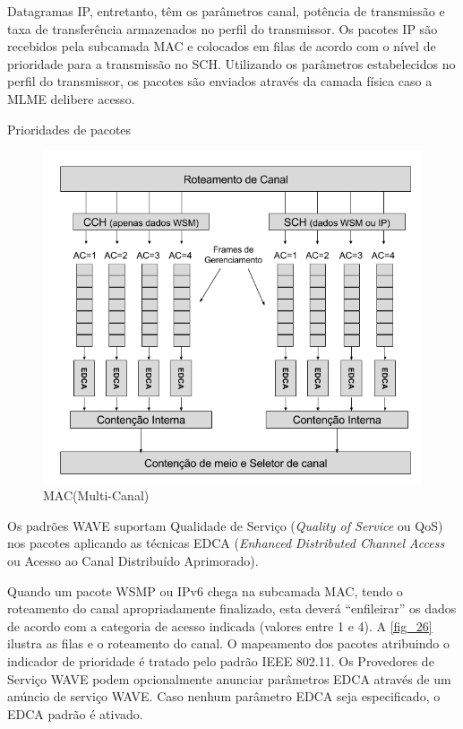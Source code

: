 \documentclass[
12pt,				%
openright,			%
oneside,			%
a4paper,			%
brazil,				%
]{abntex2}
\begin{document}
	\par Datagramas IP, entretanto, têm os parâmetros canal, potência de transmissão e taxa de transferência armazenados no perfil do transmissor. Os pacotes IP são recebidos pela subcamada MAC e colocados em filas de acordo com o nível de prioridade para a transmissão no SCH. Utilizando os parâmetros estabelecidos no perfil do transmissor, os pacotes são enviados através da camada física caso a MLME delibere acesso.

	\newpage
	
	\begin{description}
        \item[Prioridades de pacotes]
    \end{description}

	\begin{figure} [H]
		\centering
		\includegraphics[scale=.5]{figuras/cap3/26MAC(MultiCanal)}
		\caption{\label{fig_26}MAC(Multi-Canal)}
	\end{figure}
	
	\par Os padrões WAVE suportam Qualidade de Serviço (\textit{Quality of Service} ou QoS) nos pacotes aplicando as técnicas EDCA (\textit{Enhanced Distributed Channel Access} ou Acesso ao Canal Distribuído Aprimorado).
	
	\par Quando um pacote WSMP ou IPv6 chega na subcamada MAC, tendo o roteamento do canal apropriadamente finalizado, esta deverá “enfileirar” os dados de acordo com a categoria de acesso indicada (valores entre 1 e 4). A \autoref{fig_26} ilustra as filas e o roteamento do canal. O mapeamento dos pacotes atribuindo o indicador de prioridade é tratado pelo padrão IEEE 802.11. Os Provedores de Serviço WAVE podem opcionalmente anunciar parâmetros EDCA através de um anúncio de serviço WAVE. Caso nenhum parâmetro EDCA seja especificado, o EDCA padrão é ativado.
	
\end{document}
